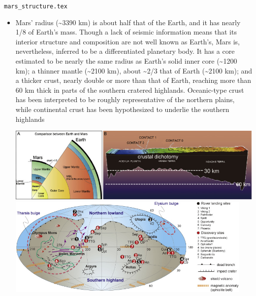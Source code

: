 \begin{flushright} {\tiny {\color{gray} \tt mars\_structure.tex}} \end{flushright}

\begin{itemize}

\item {}

\begin{displayquote}
{\color{darkgray}
Mars' radius (\~{}3390 km) is about half that of the Earth, and it 
has nearly 1/8 of Earth's mass. Though a lack of seismic information 
means that its interior structure and composition are not well known 
as Earth's, Mars is, nevertheless, inferred to be a differentiated 
planetary body. It has a core estimated to be nearly the same radius 
as Earth's solid inner core (\~{}1200 km); a thinner mantle (\~{}2100 km), 
about \~{}2/3 that of Earth (\~{}2100 km); and a thicker crust, nearly 
double or more than that of Earth, reaching more than 60 km thick 
in parts of the southern cratered highlands. Oceanic-type crust has 
been interpreted to be roughly representative of the northern plains, 
while continental crust has been hypothesized to underlie the southern highlands 
}
\end{displayquote}

\begin{center}
\includegraphics[width=14cm]{images/mars/domk18b}\\
\includegraphics[width=12cm]{images/mars/domk18a}
\end{center}


\end{itemize}
